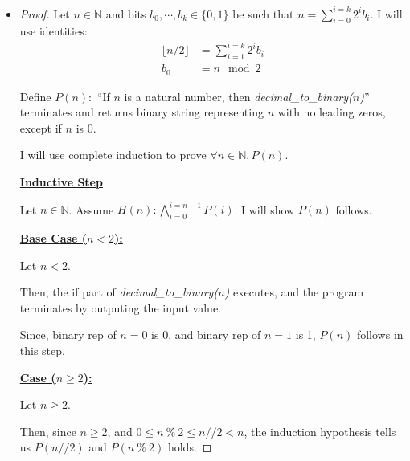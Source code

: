 \documentclass[12pt]{article}
\begin{document}
\begin{itemize}
    \item

    \begin{proof}
    Let $n \in \mathbb{N}$ and bits $b_0,\cdots,b_k \in \{0,1\}$ be such that
    $n = \sum\limits_{i = 0}^{i = k} 2^ib_i$. I will use identities:
    \setcounter{equation}{0}
    \begin{align}
        \lfloor n/2 \rfloor &= \sum\limits_{i=1}^{i=k} 2^ib_i\\
        b_0 &= n \mod 2
    \end{align}

    \bigskip

    Define $P(n):$ ``If $n$ is a natural number, then \textit{decimal\_to\_binary($n$)}''
    terminates and returns binary string representing $n$ with no leading zeros,
    except if $n$ is 0.

    \bigskip

    I will use complete induction to prove $\forall n \in \mathbb{N}, P(n)$.

    \bigskip

    \underline{\textbf{Inductive Step}}

    \bigskip

    Let $n \in \mathbb{N}$. Assume $H(n):\bigwedge\limits_{i=0}^{i=n-1} P(i)$. I will
    show $P(n)$ follows.

    \bigskip

    \underline{\textbf{Base Case ($n < 2$):}}

    \bigskip

    Let $n < 2$.

    \bigskip

    Then, the if part of \textit{decimal\_to\_binary($n$)} executes, and the
    program\\ terminates by outputing the input value.

    \bigskip

    Since, binary rep of $n=0$ is 0, and binary rep of $n=1$ is 1, $P(n)$ follows
    in this step.

    \bigskip

    \underline{\textbf{Case ($n \geq 2$):}}

    \bigskip

    Let $n \geq 2$.

    \bigskip

    Then, since $n \geq 2$, and $0 \leq n\:\%\:2 \leq n // 2 < n$, the
    induction hypothesis tells us $P(n//2)$ and $P(n\:\%\:2)$ holds.


\end{proof}
\end{itemize}
\end{document}
